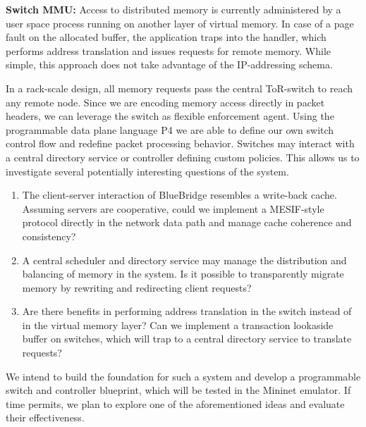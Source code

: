 \textbf{Switch MMU:} Access to distributed memory is
currently administered by a user space process running on another layer of
virtual memory. In case of a page fault on the allocated buffer, the application
traps into the handler, which performs address translation and issues requests
for remote memory. While simple, this approach does not take advantage of the
IP-addressing schema.

In a rack-scale design, all memory requests pass the central ToR-switch to reach
any remote node. Since we are encoding memory access directly in packet headers,
we can leverage the switch as flexible enforcement agent. Using the programmable
data plane language P4 we are able to define our own switch control flow and
redefine packet processing behavior. Switches may interact with a central
directory service or controller defining custom policies. This allows us to
investigate several potentially interesting questions of the system.
\begin{enumerate}
\item The client-server interaction of BlueBridge resembles a write-back cache.
Assuming servers are cooperative, could we implement a MESIF-style protocol
directly in the network data path and manage cache coherence and consistency?
\item A central scheduler and directory service may manage the distribution and
balancing of memory in the system. Is it possible to transparently migrate
memory by rewriting and redirecting client requests?
\item Are there benefits in performing address translation in the switch instead
of in the virtual memory layer? Can we implement a transaction lookaside buffer
on switches, which will trap to a central directory service to translate requests?

\end{enumerate}
We intend to build the foundation for such a system and develop a programmable
switch and controller blueprint, which will be tested in the Mininet emulator.
If time permits, we plan to explore one of the aforementioned ideas and evaluate
their effectiveness.
